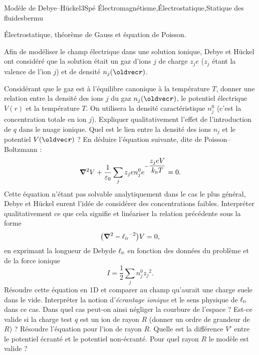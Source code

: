 
\begin{exercise}{Modèle de Debye--Hückel}{3}{Spé}
{\'Electromagnétisme,\'Electrostatique,Statique des fluides}{bermu}

\begin{questions}
    \questioncours \'Electrostatique, théorème de Gauss et équation de Poisson.
\begin{EnvUplevel}
Afin de modéliser le champ électrique dans une solution ionique, Debye et Hückel ont considéré que la solution était un gaz d'ions $j$ de charge $z_j e$ ($z_j$ étant la valence de l'ion $j$) et de densité $n_j(\vr)$.
\end{EnvUplevel}
    \question Considérant que le gaz est à l'équilibre canonique à la température $T$, donner une relation entre la densité des ions $j$ du gaz $n_j(\vr)$, le potentiel électrique $V(r)$ et la température $T$. On utilisera la densité caractéristique $n_j^0$ (c'est la concentration totale en ion $j$).
    \question Expliquer qualitativement l'effet de l'introduction de $q$ dans le nuage ionique.
    \question Quel est le lien entre la densité des ions $n_j$ et le potentiel $V(\vr)$ ? En déduire l'équation suivante, dite de Poisson--Boltzmann : \vspace{-1em}
    $$\grad^2 V + \dfrac{1}{\varepsilon_0} \sum_j z_j e n_j^0 e^{-\dfrac{z_j e V}{k_\textsc{b}T}}  = 0.$$
    \question Cette équation n'étant pas solvable analytiquement dans le cas le plus général, Debye et Hückel eurent l'idée de considérer des concentrations faibles. Interpréter qualitativement ce que cela signifie et linéariser la relation précédente sous la forme
    $$\qty(\grad^2 - {\ell_\textsc{d}}^{-2})V = 0,$$
    en exprimant la longueur de Debyde $\ell_\textsc{d}$ en fonction des données du problème et de la force ionique\vspace{-.5em}
    $$I = \dfrac{1}{2}\sum_j n_j^0 {z_j}^2.$$
    \question Résoudre cette équation en 1D et comparer au champ qu'aurait une charge suele dans le vide. Interpréter la notion d'\emph{écrantage ionique} et le sens physique de $\ell_\textsc{d}$ dans ce cas. Dans quel cas peut-on ainsi négliger la courbure de l'espace ? Est-ce valide si la charge test $q$ est un ion de rayon $R$ (donner un ordre de grandeur de $R$) ?
    \question Résoudre l'équation pour l'ion de rayon $R$. Quelle est la différence $V'$ entre le potentiel écranté et le potentiel non-écranté.
    \question Pour quel rayon $R$ le modèle est valide ?
\end{questions}


\end{exercise}
